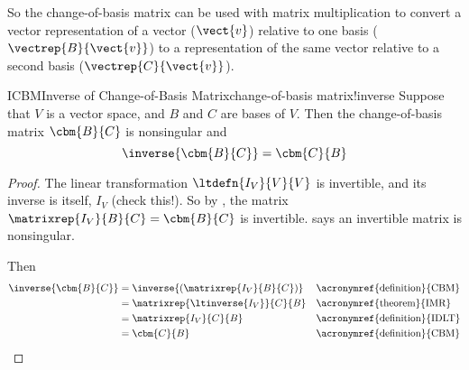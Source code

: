 %
So the change-of-basis matrix can be used with matrix multiplication to convert a vector representation of a vector ($\vect{v}$) relative to one basis ($\vectrep{B}{\vect{v}}$) to a representation of the same vector relative to a second basis ($\vectrep{C}{\vect{v}}$).
%
%
\begin{theorem}{ICBM}{Inverse of Change-of-Basis Matrix}{change-of-basis matrix!inverse}
Suppose that $V$ is a vector space, and $B$ and $C$ are bases of $V$.  
Then the change-of-basis matrix $\cbm{B}{C}$ is nonsingular and 
%
\begin{equation*}
\inverse{\cbm{B}{C}}=\cbm{C}{B}
\end{equation*}
%
\end{theorem}
%
\begin{proof}
The linear transformation $\ltdefn{I_V}{V}{V}$ is invertible, and its inverse is itself, $I_V$ (check this!). So by , the matrix $\matrixrep{I_V}{B}{C}=\cbm{B}{C}$ is invertible.   says an invertible matrix is nonsingular.\par
%
Then
%
\begin{align*}
\inverse{\cbm{B}{C}}
&=\inverse{\left(\matrixrep{I_V}{B}{C}\right)}&&\text{\acronymref{definition}{CBM}}\\
&=\matrixrep{\ltinverse{I_V}}{C}{B}&&\text{\acronymref{theorem}{IMR}}\\
&=\matrixrep{I_V}{C}{B}&&\text{\acronymref{definition}{IDLT}}\\
&=\cbm{C}{B}&&\text{\acronymref{definition}{CBM}}\\
\end{align*}
%
\end{proof}
%
%
